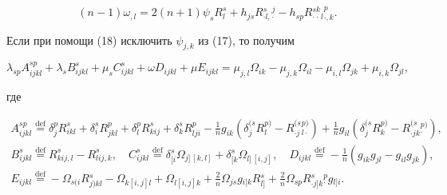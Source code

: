 \begin{equation}


(n-1)\omega_{,l}=2(n+1)\psi_sR_l^s+h_{js}R{}^s_{\cdot l,}{}^j_{\cdot}


-h_{sp}R{}^{sk}_{\cdot \cdot}{}_l{}^p_{\cdot, k}. 


\end{equation}


Если при помощи (18) исключить $\psi_{j,k}$ из (17), то получим


\begin{equation}


\lambda_{sp}A_{ijkl}^{sp}+\lambda_sB_{ijkl}^s+


\mu_sC_{ijkl}^s+\omega D_{ijkl}+\mu E_{ijkl}= 


\mu_{j,l}\Omega_{ik}-\mu_{j,k}\Omega_{il}-


\mu_{i,l}\Omega_{jk}+\mu_{i,k}\Omega_{jl}, 


\end{equation}


где 


\begin{gather*}


A_{ijkl}^{sp}\overset{\mathrm{def}}{=}{}


\delta_j^pR_{ikl}^s+\delta_i^sR_{jkl}^p+\delta


_l^pR_{kij}^s+\delta_k^sR_{lji}^p-\frac {1}{n}g_{ik}


(\delta{}_j^{(s}R{}_l^{p)}-R{}_{\cdot j}^{(s}{}_{l \cdot}^{p)})


+\frac 1ng_{il}


(\delta{}_j^{(s}R{}_k^{p)}-R{}^{(s}_{\cdot j k}{}^{p)}_\cdot),\\


%


B_{ijkl}^s\overset{\mathrm{def}}{=}{} R_{kij,l}^s-R_{lij,k}^s,\quad


C_{ijkl}^s\overset{\mathrm{def}}{=}{}


\delta{}_{[i}^s\Omega{}_{j]\,[k,l]}+\delta{}_{[k}^s\Omega{}


_{l]\,[i,j]}, \quad


D_{ijkl}\overset{\mathrm{def}}{=}{}-\frac 1n(g_{ik}g_{jl}-g_{il}g_{jk}),\\


%


E_{ijkl}\overset{\mathrm{def}}{=}{}-\Omega{}_{s(i}R{}_{j)kl}^s-


\Omega{}_{k[i,j]l}+\Omega{}_{l[i,j]k}+


\frac 2n\Omega{}_{js}g{}_{i[k}R{}_{l]}^s+


\frac 2n\Omega{}_{sp}


R{}^s_{\cdot j]k}{}^p_{\cdot}g{}_{l]i}.


\end{gather*}


